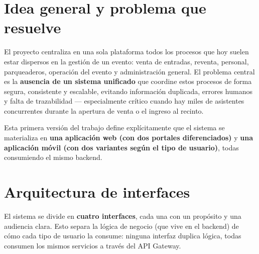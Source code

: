 \tableofcontents
\newpage

\section{Idea general y problema que resuelve}

El proyecto centraliza en una sola plataforma todos los procesos que hoy suelen estar dispersos
en la gestión de un evento: venta de entradas, reventa, personal, parqueaderos, operación del
evento y administración general. El problema central es la \textbf{ausencia de un sistema
unificado} que coordine estos procesos de forma segura, consistente y escalable, evitando
información duplicada, errores humanos y falta de trazabilidad --- especialmente crítico cuando
hay miles de asistentes concurrentes durante la apertura de venta o el ingreso al recinto.

Esta primera versión del trabajo define explícitamente que el sistema se materializa en
\textbf{una aplicación web (con dos portales diferenciados)} y \textbf{una aplicación móvil (con
dos variantes según el tipo de usuario)}, todas consumiendo el mismo backend.

\section{Arquitectura de interfaces}

El sistema se divide en \textbf{cuatro interfaces}, cada una con un propósito y una audiencia
clara. Esto separa la lógica de negocio (que vive en el backend) de cómo cada tipo de usuario la
consume: ninguna interfaz duplica lógica, todas consumen los mismos servicios a través del API
Gateway.

